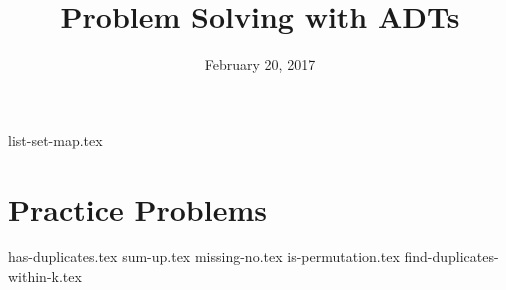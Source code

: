 \documentclass[11pt]{exam}
\title{Problem Solving with ADTs}
\date{February 20, 2017}
\begin{document}
\maketitle

{list-set-map.tex}

\clearpage

\section{Practice Problems}
\begin{questions}
{has-duplicates.tex}
{sum-up.tex}
\clearpage
{missing-no.tex}
{is-permutation.tex}
\clearpage
{find-duplicates-within-k.tex}
\end{questions}
\end{document}
